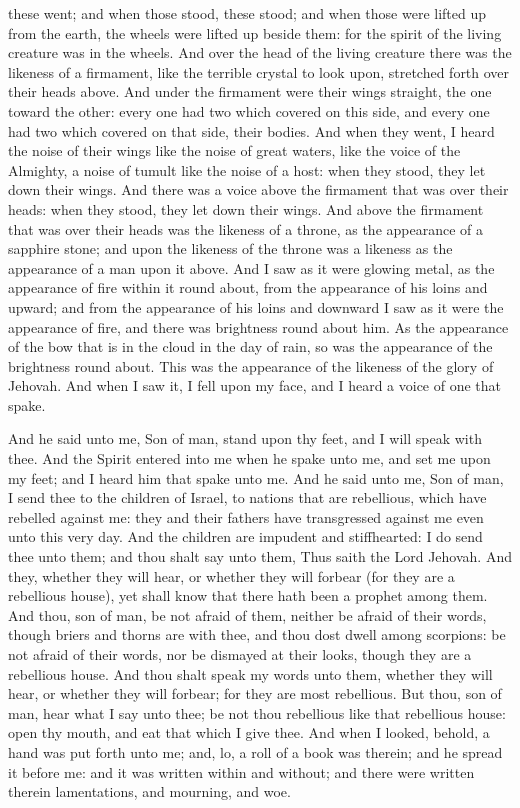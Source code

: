 these went; and when those stood, these stood; and when those were lifted up from the earth, the wheels were lifted up beside them: for the spirit of the living creature was in the wheels.  And over the head of the living creature there was the likeness of a firmament, like the terrible crystal to look upon, stretched forth over their heads above. And under the firmament were their wings straight, the one toward the other: every one had two which covered on this side, and every one had two which covered on that side, their bodies. And when they went, I heard the noise of their wings like the noise of great waters, like the voice of the Almighty, a noise of tumult like the noise of a host: when they stood, they let down their wings. And there was a voice above the firmament that was over their heads: when they stood, they let down their wings.  And above the firmament that was over their heads was the likeness of a throne, as the appearance of a sapphire stone; and upon the likeness of the throne was a likeness as the appearance of a man upon it above. And I saw as it were glowing metal, as the appearance of fire within it round about, from the appearance of his loins and upward; and from the appearance of his loins and downward I saw as it were the appearance of fire, and there was brightness round about him. As the appearance of the bow that is in the cloud in the day of rain, so was the appearance of the brightness round about. This was the appearance of the likeness of the glory of Jehovah. And when I saw it, I fell upon my face, and I heard a voice of one that spake. 

And he said unto me, Son of man, stand upon thy feet, and I will speak with thee. And the Spirit entered into me when he spake unto me, and set me upon my feet; and I heard him that spake unto me. And he said unto me, Son of man, I send thee to the children of Israel, to nations that are rebellious, which have rebelled against me: they and their fathers have transgressed against me even unto this very day. And the children are impudent and stiffhearted: I do send thee unto them; and thou shalt say unto them, Thus saith the Lord Jehovah. And they, whether they will hear, or whether they will forbear (for they are a rebellious house), yet shall know that there hath been a prophet among them. And thou, son of man, be not afraid of them, neither be afraid of their words, though briers and thorns are with thee, and thou dost dwell among scorpions: be not afraid of their words, nor be dismayed at their looks, though they are a rebellious house. And thou shalt speak my words unto them, whether they will hear, or whether they will forbear; for they are most rebellious.  But thou, son of man, hear what I say unto thee; be not thou rebellious like that rebellious house: open thy mouth, and eat that which I give thee. And when I looked, behold, a hand was put forth unto me; and, lo, a roll of a book was therein; and he spread it before me: and it was written within and without; and there were written therein lamentations, and mourning, and woe. 


